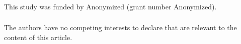 \documentclass[runningheads]{llncs}
\begin{document}
\begin{credits}
\subsubsection{\ackname} This study was funded by Anonymized (grant number Anonymized).

\subsubsection{\discintname}
The authors have no competing interests to declare that are
relevant to the content of this article.
\end{credits}



%
%
%
% 
% 
%




\end{document}
